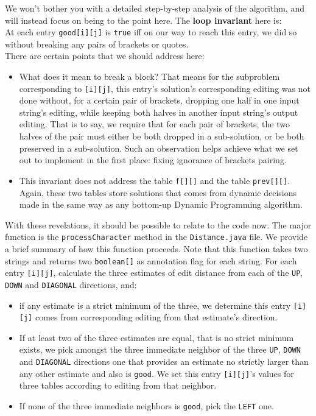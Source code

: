 \documentclass{article}
\begin{document}
We won't bother you with a detailed step-by-step analysis of the algorithm, and will instead focus on being to the point here. The \textbf{loop invariant} here is:\\

At each entry \texttt{good[i][j]} is \texttt{true} iff on our way to reach this entry, we did so without breaking any pairs of brackets or quotes.\\

There are certain points that we should address here:
\begin{itemize}
  \item What does it mean to break a block? That means for the subproblem corresponding to \texttt{[i][j]}, this entry's solution's corresponding editing was not done without, for a certain pair of brackets, dropping one half in one input string's editing, while keeping both halves in another input string's output editing. That is to say, we require that for each pair of brackets, the two halves of the pair must either be both dropped in a sub-solution, or be both preserved in a sub-solution. Such an observation helps achieve what we set out to implement in the first place: fixing ignorance of brackets pairing.
  \item This invariant does not address the table \texttt{f[][]} and the table \texttt{prev[][]}. Again, these two tables store solutions that comes from dynamic decisions made in the same way as any bottom-up Dynamic Programming algorithm. 
\end{itemize}
With these revelations, it should be possible to relate to the code now. The major function is the \texttt{processCharacter} method in the \texttt{Distance.java} file. We provide a brief summary of how this function proceeds. Note that this function takes two strings and returns two \texttt{boolean[]} as annotation flag for each string. For each entry \texttt{[i][j]}, calculate the three estimates of edit distance from each of the \texttt{UP}, \texttt{DOWN} and \texttt{DIAGONAL} directions, and:
\begin{itemize}
  \item if any estimate is a strict minimum of the three, we determine this entry \texttt{[i][j]} comes from corresponding editing from that estimate's direction.
  \item If at least two of the three estimates are equal, that is no strict minimum exists, we pick amongst the three immediate neighbor of the three \texttt{UP}, \texttt{DOWN} and \texttt{DIAGONAL} directions one that provides an estimate no strictly larger than any other estimate and also is \texttt{good}. We set this entry \texttt{[i][j]}'s values for three tables according to editing from that neighbor. 
  \item If none of the three immediate neighbors is \texttt{good}, pick the \texttt{LEFT} one. 
\end{itemize}
\end{document}
